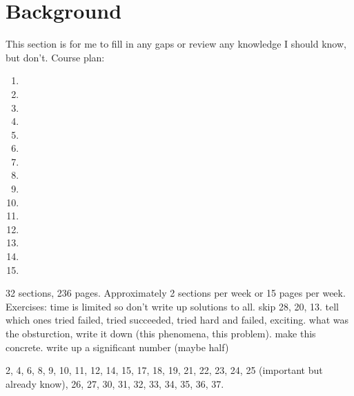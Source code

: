 \section{Background} 
This section is for me to fill in any gaps or review any knowledge I should know, but don't. Course plan:
\begin{enumerate}[label=(\arabic*)] %
\setlength\itemsep{-.2em}
    \item 
    \item 
    \item 
    \item 
    \item 
    \item 
    \item 
    \item 
    \item 
    \item 
    \item 
    \item 
    \item 
    \item 
    \item 
\end{enumerate}
32 sections, 236 pages. Approximately 2 sections per week or 15 pages per week. Exercises: time is limited so don't write up solutions to all.
skip 28, 20, 13.
tell which ones tried failed, tried succeeded, tried hard and failed, exciting. what was the obsturction, write it down (this phenomena, this problem). make this concrete. write up a significant number (maybe half)

2, 4, 6, 8, 9, 10, 11, 12, 14, 15, 17, 18, 19, 21, 22, 23, 24, 25 (important but already know), 26, 27, 30, 31, 32, 33, 34, 35, 36, 37.



